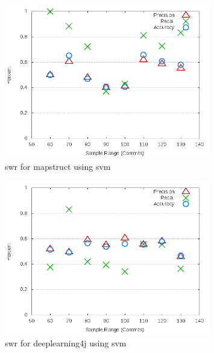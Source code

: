 \begin{figure}[!t]
\centering
\includegraphics[width=0.8\textwidth]{images/svm/test_1/mapstruct_sample_range.png}
\caption{\gls{swr} for mapstruct using \gls{svm}}
\label{fig:test_1_mapstruct_svm}
\end{figure}

\begin{figure}[!t]
\centering
\includegraphics[width=0.8\textwidth]{images/svm/test_1/deeplearning4j_sample_range.png}
\caption{\gls{swr} for deeplearning4j using \gls{svm}}
\label{fig:test_1_deeplearning4j_svm}
\end{figure}

